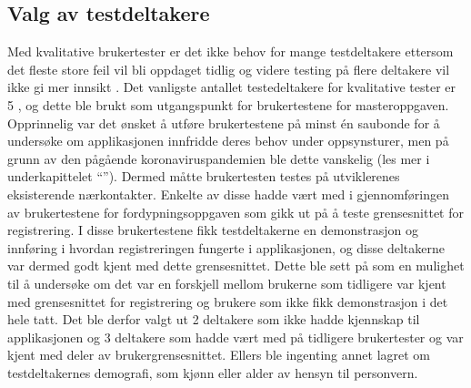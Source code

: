 \subsection{Valg av testdeltakere}
Med kvalitative brukertester er det ikke behov for mange testdeltakere ettersom det fleste store feil vil bli oppdaget tidlig og videre testing på flere deltakere vil ikke gi mer innsikt \cite[~s.43]{krugRocketSurgeryMade2010} \cite{budiuQuantitativeVsQualitative2017, renwickHowManyParticipants2019}. Det vanligste antallet testedeltakere for kvalitative tester er 5 \cite[~s.43]{krugRocketSurgeryMade2010} \cite{budiuQuantitativeVsQualitative2017, renwickHowManyParticipants2019}, og dette ble brukt som utgangspunkt for brukertestene for masteroppgaven. Opprinnelig var det ønsket å utføre brukertestene på minst én saubonde for å undersøke om applikasjonen innfridde deres behov under oppsynsturer, men på grunn av den pågående koronaviruspandemien ble dette vanskelig (les mer i underkapittelet \enquote{}). Dermed måtte brukertesten testes på utviklerenes eksisterende nærkontakter. Enkelte av disse hadde vært med i gjennomføringen av brukertestene for fordypningsoppgaven som gikk ut på å teste grensesnittet for registrering. I disse brukertestene fikk testdeltakerne en demonstrasjon og innføring i hvordan registreringen fungerte i applikasjonen, og disse deltakerne var dermed godt kjent med dette grensesnittet. Dette ble sett på som en mulighet til å undersøke om det var en forskjell mellom brukerne som tidligere var kjent med grensesnittet for registrering og brukere som ikke fikk demonstrasjon i det hele tatt. Det ble derfor valgt ut 2 deltakere som ikke hadde kjennskap til applikasjonen og 3 deltakere som hadde vært med på tidligere brukertester og var kjent med deler av brukergrensesnittet. Ellers ble ingenting annet lagret om testdeltakernes demografi, som kjønn eller alder av hensyn til personvern.

